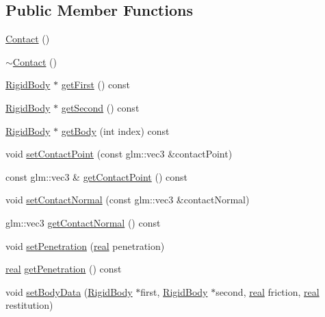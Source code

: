 \subsection*{Public Member Functions}
\begin{DoxyCompactItemize}
\item 
\mbox{\hyperlink{classr3_1_1_contact_af2648c9a1e37583ac230a40f4fc6b72d}{Contact}} ()
\item 
\mbox{\hyperlink{classr3_1_1_contact_a011905bfa1cfa3ed459650796b105c6a}{$\sim$\+Contact}} ()
\item 
\mbox{\hyperlink{classr3_1_1_rigid_body}{Rigid\+Body}} $\ast$ \mbox{\hyperlink{classr3_1_1_contact_adf157981ebfd1552521afe7b25e9239c}{get\+First}} () const
\item 
\mbox{\hyperlink{classr3_1_1_rigid_body}{Rigid\+Body}} $\ast$ \mbox{\hyperlink{classr3_1_1_contact_a90af8f5c7cba65a6a84c57b5a6ef6d70}{get\+Second}} () const
\item 
\mbox{\hyperlink{classr3_1_1_rigid_body}{Rigid\+Body}} $\ast$ \mbox{\hyperlink{classr3_1_1_contact_aaa7c4c676fd8f3b07f81cc18257c48d9}{get\+Body}} (int index) const
\item 
void \mbox{\hyperlink{classr3_1_1_contact_aedd044892a1adf0692b7cc9f81b4436a}{set\+Contact\+Point}} (const glm\+::vec3 \&contact\+Point)
\item 
const glm\+::vec3 \& \mbox{\hyperlink{classr3_1_1_contact_a9558ff3dd4e2c5331fc05076e4e503a0}{get\+Contact\+Point}} () const
\item 
void \mbox{\hyperlink{classr3_1_1_contact_af7866e211b169ce6565d3f37af8ef8d7}{set\+Contact\+Normal}} (const glm\+::vec3 \&contact\+Normal)
\item 
glm\+::vec3 \mbox{\hyperlink{classr3_1_1_contact_a2d8f594947a1900fd21e2f707384d9fe}{get\+Contact\+Normal}} () const
\item 
void \mbox{\hyperlink{classr3_1_1_contact_a828feb22ff02fe787739eb5d87cfec38}{set\+Penetration}} (\mbox{\hyperlink{namespacer3_ab2016b3e3f743fb735afce242f0dc1eb}{real}} penetration)
\item 
\mbox{\hyperlink{namespacer3_ab2016b3e3f743fb735afce242f0dc1eb}{real}} \mbox{\hyperlink{classr3_1_1_contact_afe0f0a9a42b4b1f8bd8a61f0b6a4afdd}{get\+Penetration}} () const
\item 
void \mbox{\hyperlink{classr3_1_1_contact_af394998586bc05ec666ffbd06b0f7077}{set\+Body\+Data}} (\mbox{\hyperlink{classr3_1_1_rigid_body}{Rigid\+Body}} $\ast$first, \mbox{\hyperlink{classr3_1_1_rigid_body}{Rigid\+Body}} $\ast$second, \mbox{\hyperlink{namespacer3_ab2016b3e3f743fb735afce242f0dc1eb}{real}} friction, \mbox{\hyperlink{namespacer3_ab2016b3e3f743fb735afce242f0dc1eb}{real}} restitution)

\end{DoxyCompactItemize}
